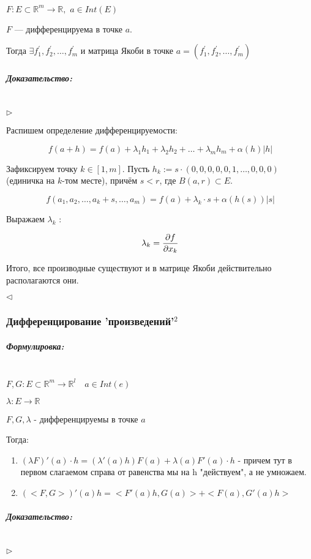 \documentclass{article}
\def\dbl{\,\,}
\let\vanillasubparagraph\subparagraph
\renewcommand{\subparagraph}[1]{\vanillasubparagraph{#1}\mbox{}\\}
\begin{document}
$F: E \subset \mathbb{R}^m \rightarrow \mathbb{R}, \dbl a \in Int(E)$

$F$ --- дифференцируема в точке $a$.

Тогда $\exists f^\prime_1, f^\prime_2, \ldots, f^\prime_m$ и матрица Якоби в точке $a = (f^\prime_1, f^\prime_2, \ldots, f^\prime_m)$

\subparagraph{Доказательство: }

$\rhd$

Распишем определение дифференцируемости:

\[f(a + h) = f(a) + \lambda_1h_1 + \lambda_2h_2 + \ldots + \lambda_mh_m + \alpha(h)|h|\]

Зафиксируем точку $k \in [1, m]$. Пусть $h_k := s \cdot (0, 0, 0, 0, 0, 1, \ldots, 0, 0, 0)$ (единичка на $k$-том месте), причём $s < r$, где $B(a, r) \subset E$.

\[f(a_1, a_2, \ldots, a_k + s, \dots, a_m) = f(a) + \lambda_k \cdot s + \alpha(h(s))|s|\]

Выражаем $\lambda_k$ :

\[\lambda_k = \pdv{f}{x_k} (a)\]

Итого, все производные существуют и в матрице Якоби действительно располагаются они.

$\lhd$

\subsubsection{Дифференцирование 'произведений'\texorpdfstring{$^2$}{}}

\subparagraph{Формулировка: }
$F, G: E \subset \mathbb R^m \to \mathbb R^l \quad a \in Int(e)$

$\lambda: E \to \mathbb R$

$F,G, \lambda$ - дифференцируемы в точке $a$

Тогда:
\begin{enumerate}
    \item $(\lambda F)'(a) \cdot h = (\lambda'(a) h) F(a) + \lambda(a) F'(a) \cdot h$ - причем тут в первом слагаемом справа от равенства мы на h "действуем", а не умножаем.
    \item $(<F, G>)'(a)h = <F'(a)h, G(a)> + <F(a), G'(a)h>$
\end{enumerate}

\subparagraph{Доказательство: }

$\rhd$
\end{document}
